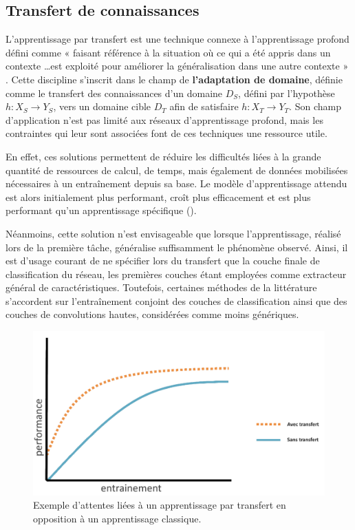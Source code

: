 \clearpage

\subsection{Transfert de connaissances}
\label{sec:transfer_learning}
L’apprentissage par transfert est une technique connexe à l’apprentissage profond défini comme « faisant référence à la situation où ce qui a été appris dans un contexte \ldots est exploité pour améliorer la généralisation dans une autre contexte » \cite{Ngiam2011}. Cette discipline s’inscrit dans le champ de \textbf{l’adaptation de domaine}, définie comme le transfert des connaissances d’un domaine $D_S$, défini par l’hypothèse $h: X_S \rightarrow Y_S$, vers un domaine cible $D_T$ afin de satisfaire $h: X_T \rightarrow Y_T$. Son champ d'application n'est pas limité aux réseaux d'apprentissage profond, mais les contraintes qui leur sont associées font de ces techniques une ressource utile.\par

En effet, ces solutions permettent de réduire les difficultés liées à la grande quantité de ressources de calcul, de temps, mais également de données mobilisées nécessaires à un entraînement depuis sa base. Le modèle d’apprentissage attendu est alors initialement plus performant, croît plus efficacement et est plus performant qu’un apprentissage spécifique ().\par

Néanmoins, cette solution n’est envisageable que lorsque l’apprentissage, réalisé lors de la première tâche, généralise suffisamment le phénomène observé. Ainsi, il est d’usage courant de ne spécifier lors du transfert que la couche finale de classification du réseau, les premières couches étant employées comme extracteur général de caractéristiques. Toutefois, certaines méthodes de la littérature s’accordent sur l'entraînement conjoint des couches de classification ainsi que des couches de convolutions hautes, considérées comme moins génériques.\par

\begin{figure}[H]
    \centering
    \includegraphics[width=\linewidth]{contents/chapter_3/resources/example_learning_curves.pdf}
    \caption{Exemple d'attentes liées à un apprentissage par transfert en opposition à un apprentissage classique.}
    \label{fig:learning_curves}
\end{figure}

